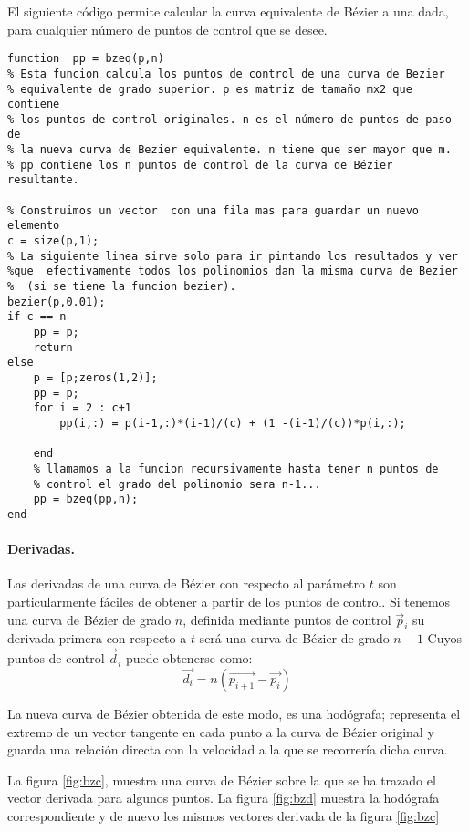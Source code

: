 El siguiente código permite calcular la curva equivalente de Bézier a una dada, para cualquier número de puntos de control que se desee. 

\begin{lstlisting}
function  pp = bzeq(p,n)
% Esta funcion calcula los puntos de control de una curva de Bezier
% equivalente de grado superior. p es matriz de tamaño mx2 que contiene 
% los puntos de control originales. n es el número de puntos de paso de 
% la nueva curva de Bezier equivalente. n tiene que ser mayor que m.
% pp contiene los n puntos de control de la curva de Bézier resultante.

% Construimos un vector  con una fila mas para guardar un nuevo elemento
c = size(p,1);
% La siguiente linea sirve solo para ir pintando los resultados y ver 
%que  efectivamente todos los polinomios dan la misma curva de Bezier 
%  (si se tiene la funcion bezier).
bezier(p,0.01);
if c == n
    pp = p;
    return
else
    p = [p;zeros(1,2)];
    pp = p;
    for i = 2 : c+1
        pp(i,:) = p(i-1,:)*(i-1)/(c) + (1 -(i-1)/(c))*p(i,:);
        
    end
    % llamamos a la funcion recursivamente hasta tener n puntos de 
    % control el grado del polinomio sera n-1...
    pp = bzeq(pp,n);
end
\end{lstlisting}

\paragraph{Derivadas.} Las derivadas de una curva de Bézier con respecto al parámetro $t$ son particularmente fáciles de obtener a partir de los puntos de control. Si tenemos una curva de Bézier de grado $n$, definida mediante puntos de control $\vec{p}_i$ su derivada primera con respecto a $t$ será una curva de Bézier de grado $n-1$ Cuyos puntos de control $\vec{d}_i$  puede obtenerse como:
\begin{equation*}
\vec{d_i} = n\left(\vec{p_{i+1}} -\vec{p_i}\right)
\end{equation*}

La nueva curva de Bézier obtenida de este modo, es una hodógrafa; representa el extremo de un vector tangente en cada punto a la curva de Bézier original  y guarda una relación directa con la velocidad a la que se recorrería dicha curva. 

La figura \ref{fig:bzc}, muestra una curva de Bézier sobre la que se ha trazado el vector derivada para algunos puntos. La figura \ref{fig:bzd} muestra la hodógrafa correspondiente y de nuevo los mismos vectores derivada de la figura \ref{fig:bzc}

